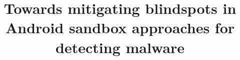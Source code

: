 \documentclass[letterpaper,twocolumn,10pt]{article}
\title{Towards mitigating blindspots in Android sandbox approaches for detecting malware}
\begin{document}

\maketitle



%
%




\balance 


\end{document}
